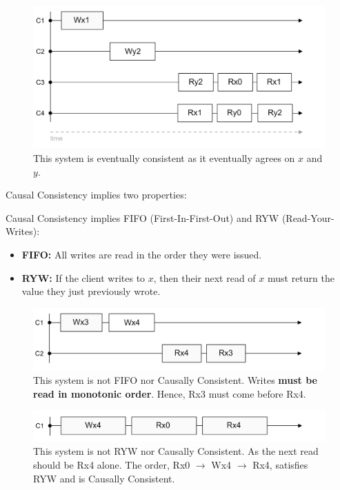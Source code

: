 \begin{figure}[h]
    \centering
    \includegraphics[width=.9\textwidth]{Sections/consist/event.png}
    \caption{This 
    system is eventually consistent as it eventually agrees on $x$ and $y$.}
\end{figure}

\newpage 

\noindent
Causal Consistency implies two properties:

\begin{theo}

    Causal Consistency implies FIFO (First-In-First-Out) and RYW (Read-Your-Writes):
    \begin{itemize}
        \item \textbf{FIFO:} All writes are read in the order they were issued.
        \item \textbf{RYW:} If the client writes to $x$, then their next read of $x$ must return the value they just previously wrote.
    \end{itemize}
\end{theo}

\begin{figure}[h]
    \centering
    \includegraphics[width=.9\textwidth]{Sections/consist/fifo.png}
    \caption{This system is not FIFO nor Causally Consistent. Writes \textbf{must be read in monotonic order}. Hence, Rx3 must come before Rx4.}
\end{figure}

\vspace{-1em}
\begin{figure}[h]
    \centering
    \includegraphics[width=.9\textwidth]{Sections/consist/ryw.png}
    \caption{This system is not RYW nor Causally Consistent. As the next read should be Rx4 alone. 
    The order, Rx0 $\rightarrow$ Wx4 $\rightarrow$ Rx4, satisfies RYW and is Causally Consistent.}
\end{figure}


